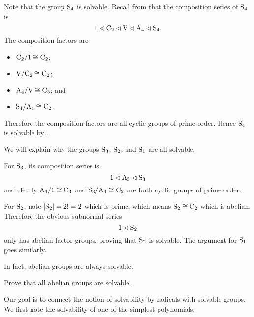 \begin{example}
    Note that the group $\mathrm{S}_{4}$ is solvable. Recall from   that the composition series of $\mathrm{S}_{4}$ is
    \[
        1 \lhd \mathrm{C}_{2} \lhd \mathrm{V} \lhd \mathrm{A}_{4} \lhd \mathrm{S}_{4}.
    \]
    The composition factors are
    \begin{itemize}
        \item $\mathrm{C}_{2}/1 \cong \mathrm{C}_{2}$;
        \item $\mathrm{V}/\mathrm{C}_{2} \cong \mathrm{C}_{2}$;
        \item $\mathrm{A}_{4}/\mathrm{V} \cong \mathrm{C}_{3}$; and
        \item $\mathrm{S}_{4}/\mathrm{A}_{4} \cong \mathrm{C}_{2}$.
    \end{itemize}
    Therefore the composition factors are all cyclic groups of prime order. Hence $\mathrm{S}_{4}$ is solvable by .
\end{example}

\begin{example}
    We will explain why the groups $\mathrm{S}_{3}$, $\mathrm{S}_{2}$, and $\mathrm{S}_{1}$ are all solvable.

    For $\mathrm{S}_{3}$, its composition series is
    \[
        1 \lhd \mathrm{A}_{3} \lhd \mathrm{S}_{3}
    \]
    and clearly $\mathrm{A}_{3}/1 \cong \mathrm{C}_{3}$ and $\mathrm{S}_{3}/\mathrm{A}_{3} \cong \mathrm{C}_{2}$ are both cyclic groups of prime order.

    For $\mathrm{S}_{2}$, note $|\mathrm{S}_{2}| = 2! = 2$ which is prime, which means $\mathrm{S}_{2} \cong \mathrm{C}_{2}$ which is abelian. Therefore the obvious subnormal series
    \[
        1 \lhd \mathrm{S}_{2}
    \]
    only has abelian factor groups, proving that $\mathrm{S}_{2}$ is solvable. The argument for $\mathrm{S}_{1}$ goes similarly.
\end{example}



In fact, abelian groups are always solvable.

\begin{exercise}\label{exercise-abelian-groups-are-solvable}
    Prove that all abelian groups are solvable.
\end{exercise}

Our goal is to connect the notion of solvability by radicals with solvable groups. We first note the solvability of one of the simplest polynomials.

